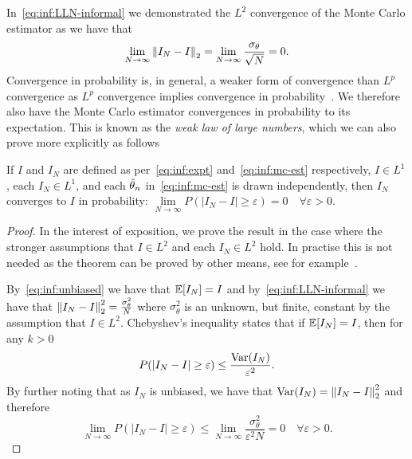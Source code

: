 In~\eqref{eq:inf:LLN-informal} we demonstrated the $L^2$ convergence of the Monte Carlo
estimator as we have that 
\[
\lim\limits_{N\rightarrow\infty} \left\lVert I_N-I\right\rVert_2=\lim\limits_{N\rightarrow\infty} \frac{\sigma_\theta}{\sqrt{N}} = 0.
\]
Convergence in probability is, in general, a weaker form of convergence than $L^p$ convergence
as $L^p$ convergence implies convergence in probability~\citep{williams1991probability}.
We therefore also have the Monte Carlo estimator convergences in
probability to its expectation.  This is known as the
\emph{weak law of large numbers}, which we can also prove more explicitly as follows
\begin{theorem}
	\label{the:inf:weak-law}
If $I$ and $I_N$ are defined as per~\eqref{eq:inf:expt} and~\eqref{eq:inf:mc-est} respectively,
$I\in L^1$, each $I_N \in L^1$,
 and each $\hat{\theta}_n$ in~\eqref{eq:inf:mc-est} is drawn independently, then $I_N$ converges to $I$
in probability:
	$\lim\limits_{N\rightarrow\infty} P(\left|I_N-I\right|\ge \varepsilon)=0 \quad \forall \varepsilon>0$.
\end{theorem}
\begin{proof}
In the interest of exposition, we prove the result in the case where the stronger 
assumptions that $I\in L^2$ and each $I_N \in L^2$ hold.  In practise this is not needed as
the theorem can be proved by other means, see for example~\cite[Theorem 2.2.7]{durrett2010probability}.

By~\eqref{eq:inf:unbiased} we have that $\mathbb{E} [I_N]=I$ and by~\eqref{eq:inf:LLN-informal} we have that 
$\left\lVert I_N-I\right\rVert_2^2 = \frac{\sigma_{\theta}^2}{N}$
where $\sigma_{\theta}^2$ is an unknown, but finite, constant by the assumption that $I\in L^2$.
Chebyshev's inequality states that if $\mathbb{E} [I_N] = I$, then for any $k>0$
\[
P(\left|I_N-I\right|\ge\varepsilon)\le\frac{\mathrm{Var}(I_N)}{\varepsilon^2}.
\]
By further noting that as $I_N$ is unbiased, we have that $\mathrm{Var}(I_N) = \left\lVert I_N-I\right\rVert_2^2$
and therefore
\[
\lim\limits_{N\rightarrow\infty} P(\left|I_N-I\right|\ge\varepsilon)
\le\lim\limits_{N\rightarrow\infty} \frac{\sigma_{\theta}^2}{\varepsilon^2 N}
=0 \quad \forall \varepsilon>0.
\]
\end{proof}

